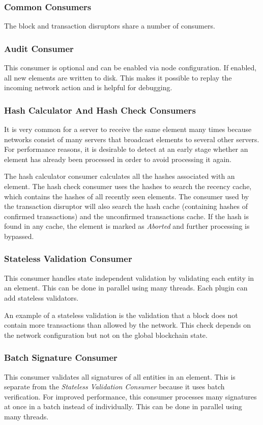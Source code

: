 \subsubsection{Common Consumers}
The block and transaction disruptors share a number of consumers.

\subsubsection*{Audit Consumer}
This consumer is optional and can be enabled via node configuration.
If enabled, all new elements are written to disk.
This makes it possible to replay the incoming network action and is helpful for debugging.

\subsubsection*{Hash Calculator And Hash Check Consumers}
It is very common for a server to receive the same element many times because networks consist of many servers that broadcast elements to several other servers.
For performance reasons, it is desirable to detect at an early stage whether an element has already been processed in order to avoid processing it again.

The hash calculator consumer calculates all the hashes associated with an element.
The hash check consumer uses the hashes to search the recency cache, which contains the hashes of all recently seen elements.
The consumer used by the transaction disruptor will also search the hash cache (containing hashes of confirmed transactions) and the unconfirmed transactions cache.
If the hash is found in any cache, the element is marked as {\it Aborted} and further processing is bypassed.

\subsubsection*{Stateless Validation Consumer}
This consumer handles state independent validation by validating each entity in an element.
This can be done in parallel using many threads.
Each plugin can add stateless validators.

An example of a stateless validation is the validation that a block does not contain more transactions than allowed by the network.
This check depends on the network configuration but not on the global blockchain state.

\subsubsection*{Batch Signature Consumer}
This consumer validates all signatures of all entities in an element.
This is separate from the {\it Stateless Validation Consumer} because it uses batch verification.
For improved performance, this consumer processes many signatures at once in a batch instead of individually.
This can be done in parallel using many threads.

